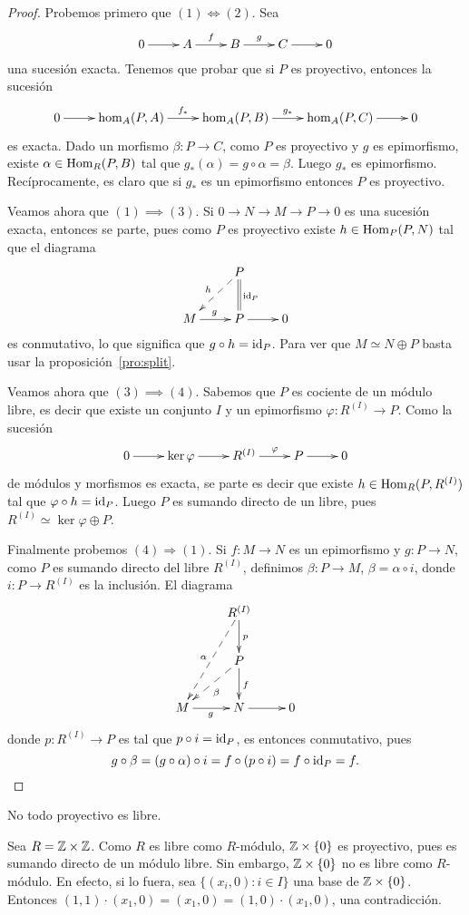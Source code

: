 \begin{proof}
	Probemos primero que $(1)\Leftrightarrow(2)$. Sea 
	\[
	\xymatrix{
	 0\ar[r] 
	 & A
	 \ar[r]^-{f}
	 & B
	 \ar[r]^-{g}
	 & C\ar[r]
	 & 0
	 }
	\]
	una sucesión exacta. Tenemos que probar que si $P$ es proyectivo, entonces la
	sucesión
	\[
	\xymatrix{
	 0\ar[r] 
	 & \hom_A(P,A)
	 \ar[r]^-{f_*}
	 & \hom_A(P,B)
	 \ar[r]^-{g_*}
	 & \hom_A(P,C)\ar[r]
	 & 0
	 }
	\]
	es exacta. Dado un morfismo $\beta\colon P\to C$, como $P$ es proyectivo y
	$g$ es epimorfismo, existe $\alpha\in\operatorname{Hom}_R(P,B)$ tal que
	$g_*(\alpha)=g\circ \alpha=\beta$. Luego $g_*$ es epimorfismo. Recíprocamente, es
	claro que si $g_*$ es un epimorfismo entonces $P$ es proyectivo. 

Veamos ahora que $(1)\implies(3)$. Si $0\to N\to M\to P\to 0$ es una sucesión exacta, entonces se parte, pues como
$P$ es proyectivo 
existe $h\in\operatorname{Hom}_P(P,N)$ tal que el diagrama
	\[
	\xymatrix{ & P\ar@{=}[d]^{\id_P}\ar@{-->}[ld]_h\\ M\ar[r]^g & P\ar[r] & 0	}
	\]
es conmutativo, lo que significa que $g\circ h=\operatorname{id}_P$. Para ver
que $M\simeq N\oplus P$ basta usar la proposición~\ref{pro:split}.

Veamos ahora que $(3)\implies(4)$. Sabemos que $P$ es cociente de un módulo libre, es decir
que existe un conjunto $I$ y un epimorfismo $\varphi\colon R^{(I)}\to P$. Como 
la sucesión
	\[
	\xymatrix{
	 0\ar[r] 
	 & \ker\varphi 
	 \ar[r]
	 & R^{(I)}
	 \ar[r]^-{\varphi}
	 & P\ar[r]
	 & 0
	 }
	\]
de módulos y morfismos 
es exacta, se parte es decir que existe $h\in\operatorname{Hom}_R(P,R^{(I)})$ tal que
$\varphi\circ h=\operatorname{id}_P$. Luego $P$ es sumando directo de un libre, pues
$R^{(I)}\simeq\ker\varphi\oplus P$. 

	Finalmente probemos $(4)\Rightarrow(1)$. Si $f\colon M\to N$ es un epimorfismo y 
	$g\colon P\to N$, como $P$ es sumando directo del libre $R^{(I)}$, definimos
	$\beta\colon P\to M$, $\beta=\alpha\circ i$, donde
	$i\colon P\to R^{(I)}$ es la inclusión. El diagrama 
	\[
	\xymatrix{ & R^{(I)}\ar[d]^p\ar@{-->}[ddl]_{\alpha} \\
	& P\ar[d]^f\ar@{-->}[dl]^{\beta}\\ M\ar[r]_g & N\ar[r] & 0 }
	\]
	donde $p\colon R^{(I)}\to P$ es tal que $p\circ i=\operatorname{id}_P$, es entonces conmutativo, pues 
	\[
		g\circ \beta=(g\circ \alpha)\circ i=f\circ (p\circ i)=f\circ \operatorname{id}_P=f.\qedhere
	\]	
\end{proof}

No todo proyectivo es libre.

\begin{example}
Sea $R=\mathbb{Z}\times\mathbb{Z}$. Como $R$ es libre como $R$-módulo, 
$\mathbb{Z}\times\{0\}$ es proyectivo, pues es sumando directo de un módulo libre. Sin embargo, $\mathbb{Z}\times\{0\}$ no es libre como $R$-módulo. En efecto,
si lo fuera, sea $\{(x_i,0):i\in I\}$ una base de $\mathbb{Z}\times\{0\}$. Entonces
$(1,1)\cdot (x_1,0)=(x_1,0)=(1,0)\cdot (x_1,0)$, una contradicción. 
\end{example}

